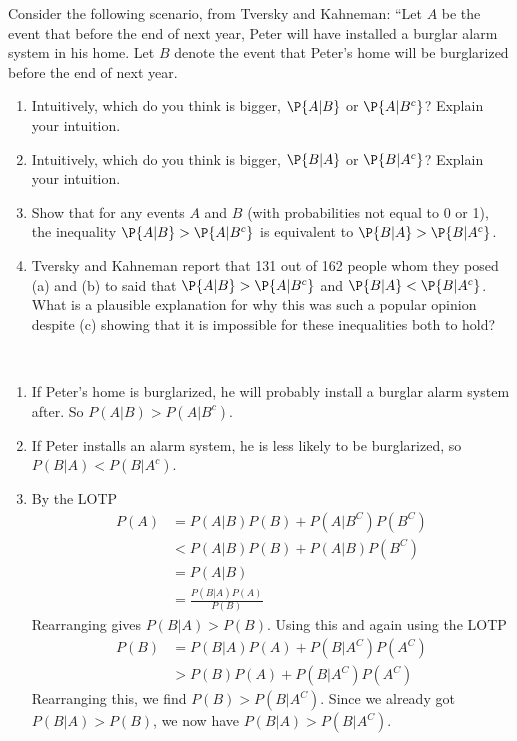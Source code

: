 

\setcounter{theorem}{9}
\begin{exercise}[BH.2.10]
Consider the following scenario, from Tversky and Kahneman: ``Let $A$ be the event that before the end of next year, Peter will have installed a burglar alarm system in his home. Let $B$ denote the event that Peter's home will be burglarized before the end of next year.
	\begin{enumerate}
		\item Intuitively, which do you think is bigger, $\P{A|B}$ or $\P{A|B^c}$? Explain your intuition.
		\item Intuitively, which do you think is bigger, $\P{B|A}$ or $\P{B|A^c}$? Explain your intuition.
		\item Show that for any events $A$ and $B$ (with probabilities not equal to 0 or 1), the inequality $\P{A|B} > \P{A|B^c}$ is equivalent to $\P{B|A} > \P{B|A^c}$.
		\item Tversky and Kahneman report that 131 out of 162 people whom they posed (a) and (b) to said that $\P{A|B} > \P{A|B^c}$ and $\P{B|A} < \P{B|A^c}$. What is a plausible explanation for why this was such a popular opinion despite (c) showing that it is impossible for these inequalities both to hold?
	\end{enumerate}
\begin{solution}~
	\begin{enumerate}
		\item If Peter's home is burglarized, he will probably install a burglar alarm system after. So $P(A|B)>P(A|B^{c})$.
		\item If Peter installs an alarm system, he is less likely to be burglarized, so $P(B|A)<P(B|A^{c})$. 
		\item By the LOTP
		\begin{align*}
			P(A)&= P(A|B)P(B)+P(A|B^{C})P(B^{C})\\
			&<P(A|B)P(B) + P(A|B)P(B^{C})\\
			&=P(A|B) \\&= \frac{P(B|A)P(A)}{P(B)}
		\end{align*}
		Rearranging gives $P(B|A)>P(B)$. 
		Using this and again using the LOTP
		\begin{align*}
			P(B) &= P(B|A)P(A) + P(B|A^{C})P(A^{C}) \\
			&>P(B)P(A)+P(B|A^{C})P(A^{C})
		\end{align*}
		Rearranging this, we find $P(B)>P(B|A^{C})$. Since we already got $P(B|A)>P(B)$, we now have $P(B|A)>P(B|A^{C})$.


\end{enumerate}
\end{solution}
\end{exercise}
